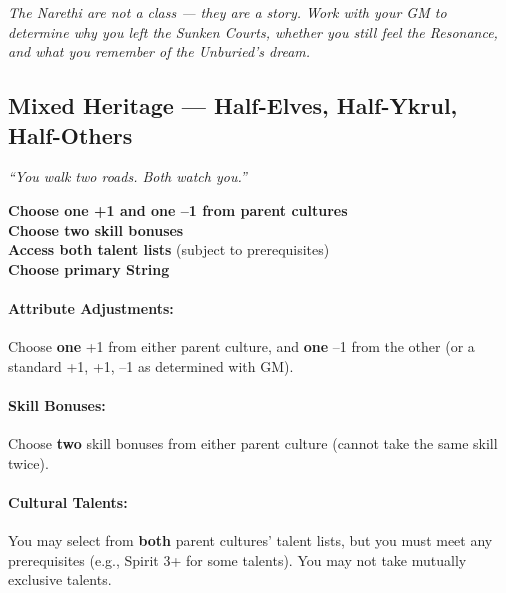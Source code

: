 \begin{tcolorbox}[colback=blue!5!white,colframe=blue!70!black,title=Player Takeaway,breakable]
\emph{The Narethi are not a class --- they are a story. Work with your GM to determine why you left the Sunken Courts, whether you still feel the Resonance, and what you remember of the Unburied's dream.}
\end{tcolorbox}

\clearpage

\subsection{Mixed Heritage --- Half-Elves, Half-Ykrul, Half-Others}
\label{sec:mixed-heritage}

\emph{``You walk two roads. Both watch you.''}

\begin{tcolorbox}[colback=black!3!white,colframe=black!40!white,title=Mixed Heritage at a Glance,breakable]
\textbf{Choose one +1 and one --1 from parent cultures} \\
\textbf{Choose two skill bonuses} \\
\textbf{Access both talent lists} (subject to prerequisites) \\
\textbf{Choose primary String}
\end{tcolorbox}

\paragraph{Attribute Adjustments:} Choose \textbf{one} +1 from either parent culture, and \textbf{one} --1 from the other (or a standard +1, +1, --1 as determined with GM).

\paragraph{Skill Bonuses:} Choose \textbf{two} skill bonuses from either parent culture (cannot take the same skill twice).

\paragraph{Cultural Talents:} You may select from \textbf{both} parent cultures' talent lists, but you must meet any prerequisites (e.g., Spirit 3+ for some talents). You may not take mutually exclusive talents.

